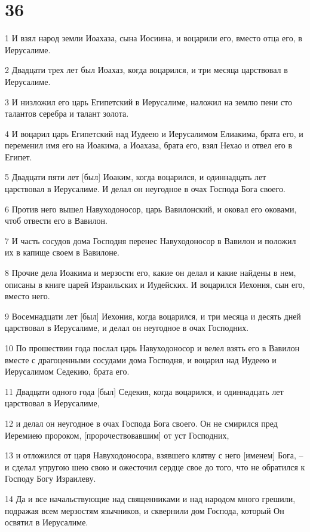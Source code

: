 \chapter{36}

\par 1 И взял народ земли Иоахаза, сына Иосиина, и воцарили его, вместо отца его, в Иерусалиме.
\par 2 Двадцати трех лет был Иоахаз, когда воцарился, и три месяца царствовал в Иерусалиме.
\par 3 И низложил его царь Египетский в Иерусалиме, наложил на землю пени сто талантов серебра и талант золота.
\par 4 И воцарил царь Египетский над Иудеею и Иерусалимом Елиакима, брата его, и переменил имя его на Иоакима, а Иоахаза, брата его, взял Нехао и отвел его в Египет.
\par 5 Двадцати пяти лет [был] Иоаким, когда воцарился, и одиннадцать лет царствовал в Иерусалиме. И делал он неугодное в очах Господа Бога своего.
\par 6 Против него вышел Навуходоносор, царь Вавилонский, и оковал его оковами, чтоб отвести его в Вавилон.
\par 7 И часть сосудов дома Господня перенес Навуходоносор в Вавилон и положил их в капище своем в Вавилоне.
\par 8 Прочие дела Иоакима и мерзости его, какие он делал и какие найдены в нем, описаны в книге царей Израильских и Иудейских. И воцарился Иехония, сын его, вместо него.
\par 9 Восемнадцати лет [был] Иехония, когда воцарился, и три месяца и десять дней царствовал в Иерусалиме, и делал он неугодное в очах Господних.
\par 10 По прошествии года послал царь Навуходоносор и велел взять его в Вавилон вместе с драгоценными сосудами дома Господня, и воцарил над Иудеею и Иерусалимом Седекию, брата его.
\par 11 Двадцати одного года [был] Седекия, когда воцарился, и одиннадцать лет царствовал в Иерусалиме,
\par 12 и делал он неугодное в очах Господа Бога своего. Он не смирился пред Иеремиею пророком, [пророчествовавшим] от уст Господних,
\par 13 и отложился от царя Навуходоносора, взявшего клятву с него [именем] Бога, --и сделал упругою шею свою и ожесточил сердце свое до того, что не обратился к Господу Богу Израилеву.
\par 14 Да и все начальствующие над священниками и над народом много грешили, подражая всем мерзостям язычников, и сквернили дом Господа, который Он освятил в Иерусалиме.
